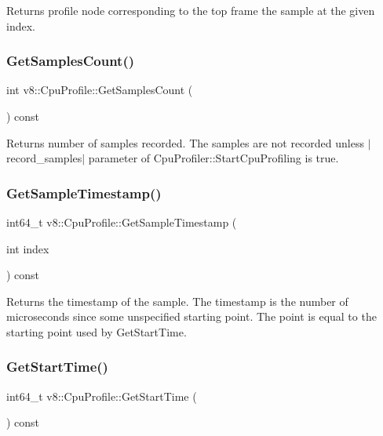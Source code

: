 Returns profile node corresponding to the top frame the sample at the given index. \mbox{\label{classv8_1_1CpuProfile_a26d1c490bd4e36090ed75706cbaf64fe}} 
\subsubsection{\texorpdfstring{Get\+Samples\+Count()}{GetSamplesCount()}}
{\footnotesize\ttfamily int v8\+::\+Cpu\+Profile\+::\+Get\+Samples\+Count (\begin{DoxyParamCaption}{ }\end{DoxyParamCaption}) const}

Returns number of samples recorded. The samples are not recorded unless $\vert$record\+\_\+samples$\vert$ parameter of Cpu\+Profiler\+::\+Start\+Cpu\+Profiling is true. \mbox{\label{classv8_1_1CpuProfile_a7c243a327e65455f087c738c570ddae8}} 
\subsubsection{\texorpdfstring{Get\+Sample\+Timestamp()}{GetSampleTimestamp()}}
{\footnotesize\ttfamily int64\+\_\+t v8\+::\+Cpu\+Profile\+::\+Get\+Sample\+Timestamp (\begin{DoxyParamCaption}\item[{int}]{index }\end{DoxyParamCaption}) const}

Returns the timestamp of the sample. The timestamp is the number of microseconds since some unspecified starting point. The point is equal to the starting point used by Get\+Start\+Time. \mbox{\label{classv8_1_1CpuProfile_a9f7a7d6a8cdc68bad1016a428eef4cd0}} 
\subsubsection{\texorpdfstring{Get\+Start\+Time()}{GetStartTime()}}
{\footnotesize\ttfamily int64\+\_\+t v8\+::\+Cpu\+Profile\+::\+Get\+Start\+Time (\begin{DoxyParamCaption}{ }\end{DoxyParamCaption}) const}

